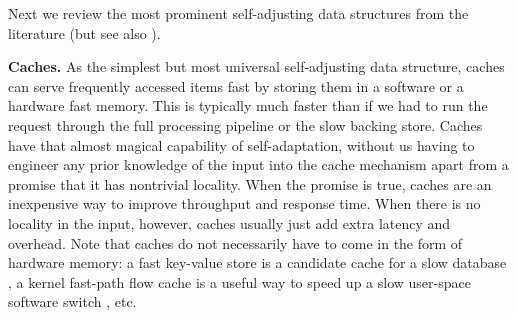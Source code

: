 Next we review the most prominent self-adjusting data structures from the literature (but see also \cite{BoseDL08, Avin0020, ParkM12}).


\noindent%
\textbf{Caches.} %
As the simplest but most universal self-adjusting data structure, caches can serve frequently accessed items fast by storing them in a  software or a hardware fast memory. This is typically much faster than if we had to run the request through the full processing pipeline or the slow backing store. Caches have that almost magical capability of self-adaptation, without us having to engineer any prior knowledge of the input into the cache mechanism apart from a promise that it has nontrivial locality. When the promise is true, caches are an inexpensive way to improve throughput and response time. When there is no locality in the input, however, caches usually just add extra latency and overhead.
%
Note that caches do not necessarily have to come in the form of hardware memory: a fast key-value store is a candidate cache for a slow database \cite{10.5555/1012889.1012894}, a kernel fast-path flow cache is a useful way to speed up a slow user-space software switch \cite{188960}, etc.



